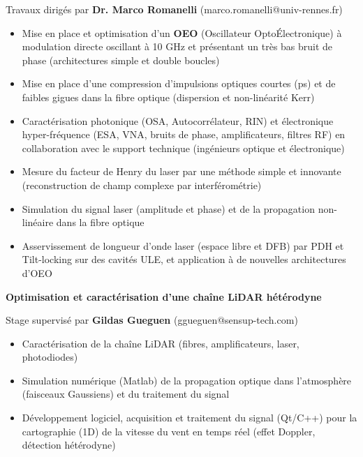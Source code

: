 \documentclass[9pt,a4paper,academicons]{altacv}
\begin{document}
Travaux dirigés par \textbf{Dr. Marco Romanelli} (marco.romanelli@univ-rennes.fr)
\smallskip
\small{
	\begin{itemize}
		\item Mise en place et optimisation d'un \textbf{OEO} (Oscillateur Opto\'Electronique) à modulation directe oscillant à 10 GHz et présentant un très bas bruit de phase (architectures simple et double boucles)
		\item Mise en place d'une compression d'impulsions optiques courtes (ps) et de faibles gigues dans la fibre optique (dispersion et non-linéarité Kerr)
		\item Caractérisation photonique (OSA, Autocorrélateur, RIN) et électronique hyper-fréquence (ESA, VNA, bruits de phase, amplificateurs, filtres RF) en collaboration avec le support technique (ingénieurs optique et électronique)
		\item Mesure du facteur de Henry du laser par une méthode simple et innovante (reconstruction de champ complexe par interférométrie)
		\item Simulation  du signal laser (amplitude et phase) et de la propagation non-linéaire dans la fibre optique
		\item Asservissement de longueur d'onde laser (espace libre et DFB) par PDH et Tilt-locking sur des cavités ULE, et application à de nouvelles architectures d'OEO
	\end{itemize}
}

\divider


\textbf{Optimisation et caractérisation d'une chaîne LiDAR hétérodyne}\smallskip

Stage supervisé par \textbf{Gildas Gueguen} (ggueguen@sensup-tech.com)
\smallskip
\small{
	\begin{itemize}
		\item Caractérisation de la chaîne LiDAR (fibres, amplificateurs, laser, photodiodes)
		\item Simulation numérique (Matlab) de la propagation optique dans l'atmosphère (faisceaux Gaussiens) et du traitement du signal
		\item Développement logiciel, acquisition et traitement du signal (Qt/C++) pour la cartographie (1D) de la vitesse du vent en temps réel (effet Doppler, détection hétérodyne)
	\end{itemize}
}

\divider
\end{document}

